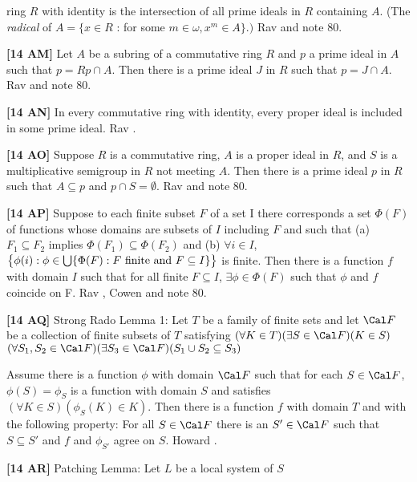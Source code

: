ring $R$ with identity is the intersection of all prime ideals in $R$
containing $A$. (The {\it radical} of $A = \{x\in R$ : for some
$m\in\omega, x^{m}\in A\}.)$ \ac{Rav} \cite{1977} and note 80.
\smallskip
\item{}{\bf [14 AM]}  Let $A$ be a subring of a commutative ring $R$ and
$p$ a prime ideal in $A$ such that $p = Rp \cap A$.  Then there is  a
prime ideal $J$ in $R$ such that $p = J \cap A$. \ac{Rav} \cite{1977} and
note 80.
\smallskip
\item{}{\bf [14 AN]}  In every commutative ring  with  identity,  every
proper ideal is included in some prime ideal.  \ac{Rav} \cite{1977}.
\smallskip
\item{}{\bf [14 AO]}  Suppose $R$ is a commutative ring, $A$ is a
proper ideal in $R$, and $S$ is a multiplicative semigroup in $R$
not meeting $A$.  Then there is a prime ideal $p$  in $R$  such that
$A \subseteq  p$ and $p\cap S=\emptyset$. \ac{Rav} \cite{1977} and note 80.
\smallskip
\item{}{\bf [14 AP]}  Suppose to each finite subset $F$ of a set I there
corresponds a set $\Phi (F)$ of functions whose domains are  subsets
of $I$ including $F$ and such that (a) $F_{1}\subseteq F_{2}$ implies
$\Phi(F_{1})\subseteq\Phi(F_{2})$ and (b) $\forall i\in I$, $\bigl\{\phi(i)
: \phi\in\bigcup\{\Phi(F): F\hbox{ finite and }F\subseteq I\}\bigr\}$
is finite.  Then there is a function $f$ with domain $I$ such
that for all finite $F\subseteq I$, $\exists\phi\in\Phi(F)$
such that $\phi$ and $f$ coincide on F. \ac{Rav} \cite{1977}, \ac{Cowen}
\cite{1973} and note 80.
\smallskip
\item{}{\bf [14 AQ]}  Strong Rado Lemma 1: Let $T$ be a family of finite
sets and let ${\Cal F}$ be a collection of finite subsets of $T$
satisfying
 $(\forall K\in T)(\exists S\in{\Cal F})(K\in S)$
 $(\forall S_{1}, S_{2}\in{\Cal F})(\exists S_{3}\in
{\Cal F})(S_{1}\cup S_{2}\subseteq S_{3})$
\item{}Assume there is a function $\phi$ with domain ${\Cal F}$ such that
for each $S\in{\Cal F}$, $\phi(S) = \phi_{S}$ is a function with domain
$S$ and satisfies $(\forall K\in S)(\phi_{S}(K)\in K)$. Then there is a
function $f$ with domain $T$ and with the following property:  For all
$S\in{\Cal F}$ there is an $S'\in{\Cal F}$ such that $S\subseteq S'$ and
$f$ and $\phi_{S'}$ agree on $S$.  \ac{Howard} \cite{1993}.
\smallskip
\item{}{\bf [14 AR]}  Patching Lemma:  Let $L$ be a local system of $S$
